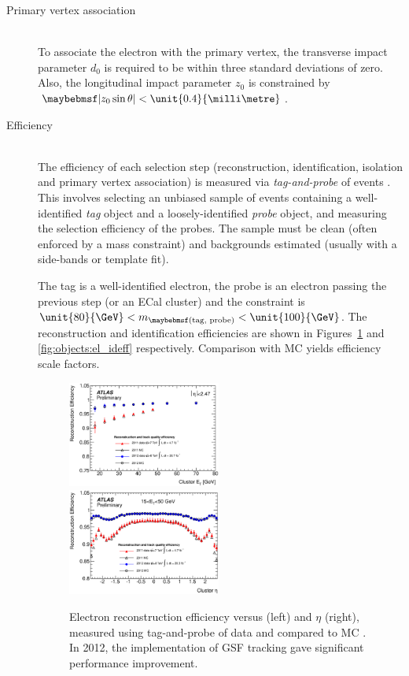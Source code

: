 \begin{description}
\item[Primary vertex association] \hfill \\
	To associate the electron with the primary vertex, the transverse impact parameter 
	$d_0$ is required to be within three standard deviations of zero. Also, the 
	longitudinal impact parameter $z_0$ is constrained by $\mods{z_0 \sin\theta} < 
	\unit{0.4}{\milli\metre}$.

\item[Efficiency] \hfill \\
	The efficiency of each selection step (reconstruction, identification, isolation and 
	primary vertex association) is measured via \textit{tag-and-probe} of 
	\HepProcess{\PZ \HepTo \Pe\Pe} events \cite{ElectronPerf:2010,ElectronPerf:2012}. 
	This involves selecting an unbiased sample of events containing a well-identified 
	\textit{tag} object and a loosely-identified \textit{probe} object, and measuring the 
	selection efficiency of the probes. The sample must be clean (often enforced by a 
	mass constraint) and backgrounds estimated (usually with a side-bands or template fit).

	The tag is a well-identified electron, the probe is an electron passing the previous 
	step (or an ECal cluster) and the constraint is $\unit{80}{\GeV} < 
	m_{\parenths{\text{tag, probe}}} < \unit{100}{\GeV}$. The reconstruction and 
	identification efficiencies are shown in Figures~\ref{fig:objects:el_recoeff} and 
	\ref{fig:objects:el_ideff} respectively. Comparison with MC yields efficiency 
	scale factors.

	\begin{figure}
		\includegraphics[width=0.495\textwidth]{tex/selection/el_recoeff_et}
		\hfill
		\includegraphics[width=0.495\textwidth]{tex/selection/el_recoeff_eta}
		\caption{Electron reconstruction efficiency versus \et (left) and $\eta$ (right), 
		measured using tag-and-probe of \HepProcess{\PZ \HepTo \Pe\Pe} data and compared 
		to MC \cite{ElectronPerf:2012}. In 2012, the implementation of GSF tracking gave 
		significant performance improvement.}
		\label{fig:objects:el_recoeff}
	\end{figure}


\end{description}
